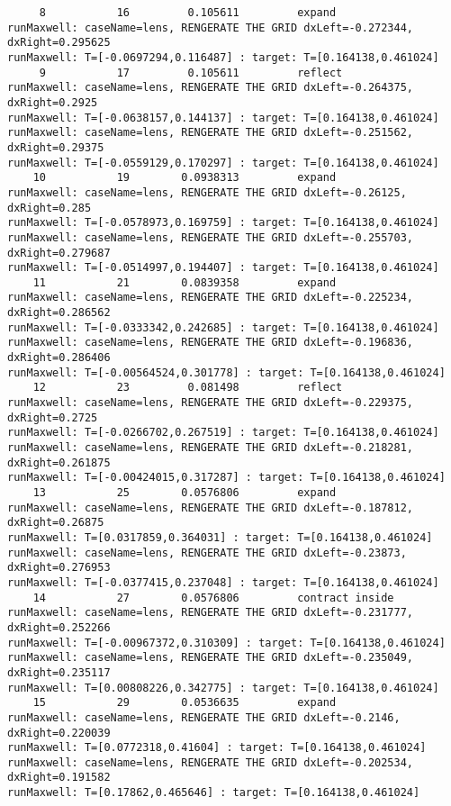 \documentclass[11pt]{article}
\begin{document}
{\begin{verbatim}
     8           16         0.105611         expand
runMaxwell: caseName=lens, RENGERATE THE GRID dxLeft=-0.272344, dxRight=0.295625
runMaxwell: T=[-0.0697294,0.116487] : target: T=[0.164138,0.461024]
     9           17         0.105611         reflect
runMaxwell: caseName=lens, RENGERATE THE GRID dxLeft=-0.264375, dxRight=0.2925
runMaxwell: T=[-0.0638157,0.144137] : target: T=[0.164138,0.461024]
runMaxwell: caseName=lens, RENGERATE THE GRID dxLeft=-0.251562, dxRight=0.29375
runMaxwell: T=[-0.0559129,0.170297] : target: T=[0.164138,0.461024]
    10           19        0.0938313         expand
runMaxwell: caseName=lens, RENGERATE THE GRID dxLeft=-0.26125, dxRight=0.285
runMaxwell: T=[-0.0578973,0.169759] : target: T=[0.164138,0.461024]
runMaxwell: caseName=lens, RENGERATE THE GRID dxLeft=-0.255703, dxRight=0.279687
runMaxwell: T=[-0.0514997,0.194407] : target: T=[0.164138,0.461024]
    11           21        0.0839358         expand
runMaxwell: caseName=lens, RENGERATE THE GRID dxLeft=-0.225234, dxRight=0.286562
runMaxwell: T=[-0.0333342,0.242685] : target: T=[0.164138,0.461024]
runMaxwell: caseName=lens, RENGERATE THE GRID dxLeft=-0.196836, dxRight=0.286406
runMaxwell: T=[-0.00564524,0.301778] : target: T=[0.164138,0.461024]
    12           23         0.081498         reflect
runMaxwell: caseName=lens, RENGERATE THE GRID dxLeft=-0.229375, dxRight=0.2725
runMaxwell: T=[-0.0266702,0.267519] : target: T=[0.164138,0.461024]
runMaxwell: caseName=lens, RENGERATE THE GRID dxLeft=-0.218281, dxRight=0.261875
runMaxwell: T=[-0.00424015,0.317287] : target: T=[0.164138,0.461024]
    13           25        0.0576806         expand
runMaxwell: caseName=lens, RENGERATE THE GRID dxLeft=-0.187812, dxRight=0.26875
runMaxwell: T=[0.0317859,0.364031] : target: T=[0.164138,0.461024]
runMaxwell: caseName=lens, RENGERATE THE GRID dxLeft=-0.23873, dxRight=0.276953
runMaxwell: T=[-0.0377415,0.237048] : target: T=[0.164138,0.461024]
    14           27        0.0576806         contract inside
runMaxwell: caseName=lens, RENGERATE THE GRID dxLeft=-0.231777, dxRight=0.252266
runMaxwell: T=[-0.00967372,0.310309] : target: T=[0.164138,0.461024]
runMaxwell: caseName=lens, RENGERATE THE GRID dxLeft=-0.235049, dxRight=0.235117
runMaxwell: T=[0.00808226,0.342775] : target: T=[0.164138,0.461024]
    15           29        0.0536635         expand
runMaxwell: caseName=lens, RENGERATE THE GRID dxLeft=-0.2146, dxRight=0.220039
runMaxwell: T=[0.0772318,0.41604] : target: T=[0.164138,0.461024]
runMaxwell: caseName=lens, RENGERATE THE GRID dxLeft=-0.202534, dxRight=0.191582
runMaxwell: T=[0.17862,0.465646] : target: T=[0.164138,0.461024]

\end{verbatim}}
\end{document}
